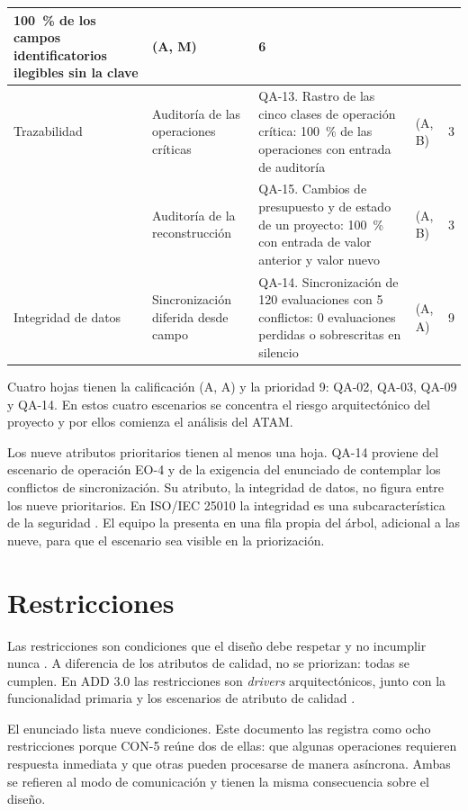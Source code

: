 \documentclass[11pt,letterpaper]{article}
\begin{document}
\begin{longtable}{L{2.9cm} L{3.7cm} L{6.4cm} C{1.3cm} C{0.8cm}}
\qty{100}{\percent} de los campos identificatorios ilegibles sin la clave & (A, M) & 6 \\
\midrule
Trazabilidad & Auditoría de las operaciones críticas & QA-13. Rastro de las cinco clases de
operación crítica: \qty{100}{\percent} de las operaciones con entrada de auditoría & (A, B) & 3 \\
 & Auditoría de la reconstrucción & QA-15. Cambios de presupuesto y de estado de un proyecto:
\qty{100}{\percent} con entrada de valor anterior y valor nuevo & (A, B) & 3 \\
\midrule
Integridad de datos & Sincronización diferida desde campo & QA-14. Sincronización de 120
evaluaciones con 5 conflictos: 0 evaluaciones perdidas o sobrescritas en silencio & (A, A) &
9 \\
\end{longtable}

Cuatro hojas tienen la calificación (A, A) y la prioridad 9: QA-02, QA-03, QA-09 y QA-14. En estos
cuatro escenarios se concentra el riesgo arquitectónico del proyecto y por ellos comienza el
análisis del ATAM.

Los nueve atributos prioritarios tienen al menos una hoja. QA-14 proviene del escenario de operación
EO-4 y de la exigencia del enunciado de contemplar los conflictos de sincronización. Su atributo, la
integridad de datos, no figura entre los nueve prioritarios. En ISO/IEC 25010 la integridad es una
subcaracterística de la seguridad \cite{iso25010}. El equipo la presenta en una fila propia del
árbol, adicional a las nueve, para que el escenario sea visible en la priorización.

\newpage
\section{Restricciones}
\label{sec:restricciones}

Las restricciones son condiciones que el diseño debe respetar y no incumplir nunca
\cite{enunciado}. A diferencia de los atributos de calidad, no se priorizan: todas se cumplen. En
ADD 3.0 las restricciones son \emph{drivers} arquitectónicos, junto con la funcionalidad primaria y
los escenarios de atributo de calidad \cite{cervantes}.

El enunciado lista nueve condiciones. Este documento las registra como ocho restricciones porque
CON-5 reúne dos de ellas: que algunas operaciones requieren respuesta inmediata y que otras pueden
procesarse de manera asíncrona. Ambas se refieren al modo de comunicación y tienen la misma
consecuencia sobre el diseño.
\end{document}
